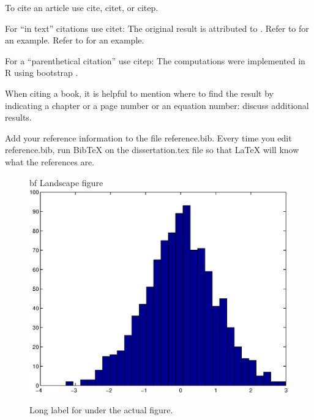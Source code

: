 
To cite an article use cite, citet, or citep.

For ``in text'' citations use citet:  The original result is attributed to \citet{vn28}.
Refer to \citet{mardia70} for an example.
Refer to \cite{mardia70} for an example.

For a ``parenthetical citation'' use citep:  The computations were implemented in R \citep{R}
using bootstrap \citep{dh97,et93}.

When citing a book, it is helpful to mention where to find the result by indicating
a chapter or a page number or an equation number:  \citet[Ch.~6]{et93} discuss additional results.

Add your reference information to the file reference.bib.
Every time you edit reference.bib, run BibTeX on the dissertation.tex file so that LaTeX will know what the references are.



\begin{figure}
\centering
{bf Landscape figure}
\includegraphics[width=\hsize-1in]{figure.eps}
\caption[Short label for List of Figures]{ 
Long label for under the actual figure.}
\end{figure}



